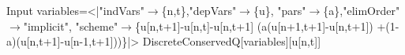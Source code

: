 \begin{mmaCell}[moredefined={variables, DiscreteConservedQ}]{Input}
  variables=<|"indVars"\(\pmb{\to}\)\{n,t\},"depVars"\(\pmb{\to}\)\{u\},
  "pars"\(\pmb{\to}\)\{a\},"elimOrder"\(\pmb{\to}\)"implicit",
  "scheme"\(\pmb{\to}\)\{u[n,t+1]-u[n,t]-u[n,t+1]
  (a(u[n+1,t+1]-u[n,t+1])
  +(1-a)(u[n,t+1]-u[n-1,t+1]))\}|>
  DiscreteConservedQ[variables][u[n,t]]
  
\end{mmaCell}